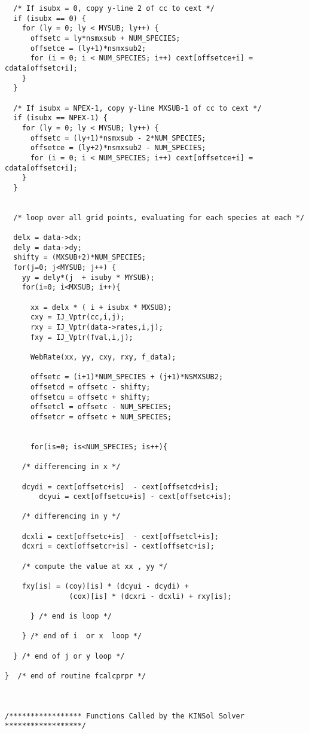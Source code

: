 \documentclass[11pt]{article}
\begin{document}
\begin{verbatim}
  /* If isubx = 0, copy y-line 2 of cc to cext */
  if (isubx == 0) {
    for (ly = 0; ly < MYSUB; ly++) {
      offsetc = ly*nsmxsub + NUM_SPECIES;
      offsetce = (ly+1)*nsmxsub2;
      for (i = 0; i < NUM_SPECIES; i++) cext[offsetce+i] = cdata[offsetc+i];
    }
  }

  /* If isubx = NPEX-1, copy y-line MXSUB-1 of cc to cext */
  if (isubx == NPEX-1) {
    for (ly = 0; ly < MYSUB; ly++) {
      offsetc = (ly+1)*nsmxsub - 2*NUM_SPECIES;
      offsetce = (ly+2)*nsmxsub2 - NUM_SPECIES;
      for (i = 0; i < NUM_SPECIES; i++) cext[offsetce+i] = cdata[offsetc+i];
    }
  }


  /* loop over all grid points, evaluating for each species at each */

  delx = data->dx;
  dely = data->dy;
  shifty = (MXSUB+2)*NUM_SPECIES;
  for(j=0; j<MYSUB; j++) {
    yy = dely*(j  + isuby * MYSUB);
    for(i=0; i<MXSUB; i++){

      xx = delx * ( i + isubx * MXSUB);
      cxy = IJ_Vptr(cc,i,j);
      rxy = IJ_Vptr(data->rates,i,j);
      fxy = IJ_Vptr(fval,i,j);
      
      WebRate(xx, yy, cxy, rxy, f_data);

      offsetc = (i+1)*NUM_SPECIES + (j+1)*NSMXSUB2;
      offsetcd = offsetc - shifty;
      offsetcu = offsetc + shifty;
      offsetcl = offsetc - NUM_SPECIES;
      offsetcr = offsetc + NUM_SPECIES;

      
      for(is=0; is<NUM_SPECIES; is++){

    /* differencing in x */

    dcydi = cext[offsetc+is]  - cext[offsetcd+is];
        dcyui = cext[offsetcu+is] - cext[offsetc+is];
    
    /* differencing in y */

    dcxli = cext[offsetc+is]  - cext[offsetcl+is];
    dcxri = cext[offsetcr+is] - cext[offsetc+is];

    /* compute the value at xx , yy */

    fxy[is] = (coy)[is] * (dcyui - dcydi) +
               (cox)[is] * (dcxri - dcxli) + rxy[is];

      } /* end is loop */

    } /* end of i  or x  loop */

  } /* end of j or y loop */

}  /* end of routine fcalcprpr */



/***************** Functions Called by the KINSol Solver ******************/



\end{verbatim}
\end{document}
